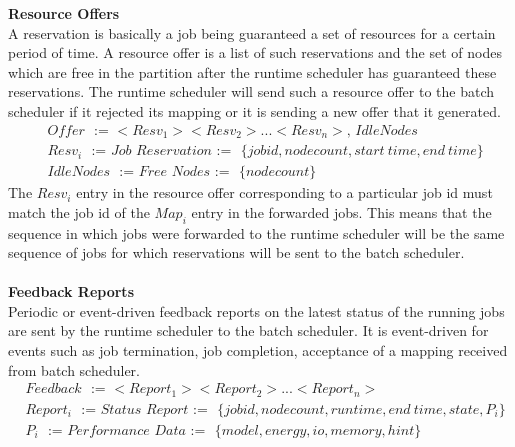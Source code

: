 \textbf{Resource Offers}\\
A reservation is basically a job being guaranteed a set of resources for a certain period of time. A resource offer is a list of such reservations and the set of nodes which are free in the partition after the runtime scheduler has guaranteed these reservations. The runtime scheduler will send such a resource offer to the batch scheduler if it rejected its mapping or it is sending a new offer that it generated.\\
\begin{equation*}
\begin{aligned}
&Offer\ \ \ \textit{:=\ \ \ $<Resv_{1}><Resv_{2}>...<Resv_{n}>$,\ IdleNodes}\\
&Resv_{i}\ \ \ \textit{:=\ \ \ Job Reservation\ \ \ :=}\ \ \ \{jobid,node count,start\ time,end\ time\}\\
&IdleNodes\ \ \ \textit{:=\ \ \ Free Nodes\ \ \ :=}\ \ \ \{nodecount\}
\end{aligned}
\end{equation*}
The \textbf{\textit{$Resv_{i}$}} entry in the resource offer corresponding to a particular job id must match the job id of the \textbf{\textit{$Map_{i}$}} entry in the forwarded jobs. This means that the sequence in which jobs were forwarded to the runtime scheduler will be the same sequence of jobs for which reservations will be sent to the batch scheduler.\\ \\
\textbf{Feedback Reports}\\
Periodic or event-driven feedback reports on the latest status of the running jobs are sent by the runtime scheduler to the batch scheduler. It is event-driven for events such as job termination, job completion, acceptance of a mapping received from batch scheduler.
\begin{equation*}
\begin{aligned}
&Feedback\ \ \ \textit{:=\ \ \ $<Report_{1}><Report_{2}>...<Report_{n}>$}\\
&Report_{i}\ \ \ \textit{:=\ \ \ Status Report\ \ \ :=}\ \ \ \{jobid,node count,runtime,end\ time,state,P_{i}\}\\
&P_{i}\ \ \ \textit{:=\ \ \ Performance Data\ \ \ :=}\ \ \ \{model,energy,io,memory,hint\}
\end{aligned}
\end{equation*}

